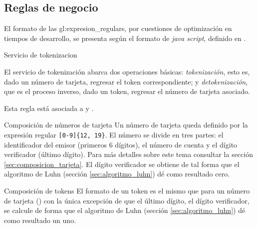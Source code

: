 %
%

\subsection{Reglas de negocio}

El formato de las \glspl{gl:expresion_regular}, por cuestiones de optimización
en tiempos de desarrollo, se presenta según el formato de \textit{java script},
definido en \cite{mozilla_er}.

{Servicio de tokenizacion}
{
  El servicio de tokenización abarca dos operaciones básicas:
  \textit{tokenización}, esto es, dado un número de tarjeta, regresar el token
  correspondiente; y \textit{detokenización}, que es el proceso inverso, dado un
  token, regresar el número de tarjeta asociado.

  Esta regla está asociada a  y
  .
}

{Composición de números de tarjeta}
{
  Un número de tarjeta queda definido por la expresión regular
  \texttt{[0-9]\{12, 19\}}. El número se divide en tres partes: el
  identificador del emisor (primeros 6 dígitos), el número de cuenta y el dígito
  verificador (último dígito). Para más detalles sobre este tema consultar la
  sección \ref{sec:composicion_tarjeta}. El dígito verificador se obtiene de tal
  forma que el algoritmo de Luhn (sección \ref{sec:algoritmo_luhn}) dé como
  resultado cero.
}

{Composición de tokens}
{
  El formato de un token es el mismo que para un número de tarjeta
  () con la única excepción de que el
  último dígito, el dígito verificador, se calcule de forma que el algoritmo de
  Luhn (sección \ref{sec:algoritmo_luhn}) dé como resultado un uno.
}


